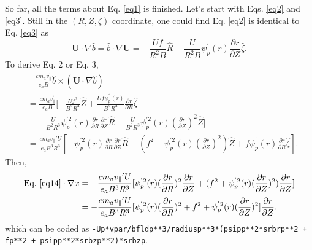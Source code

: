 \documentclass[12pt]{article}
\begin{document}
\begin{CJK*}{UTF8}{gbsn}
So far, all the terms about Eq. \ref{eq1} is finished. Let's start with Eqs. \ref{eq2} and \ref{eq3}.
Still in the $(R,Z,\zeta)$ coordinate, one could find Eq. \ref{eq2} is identical to Eq. \ref{eq3} as
\begin{equation}
    \mathbf{U}\cdot\nabla\hat{b} = \hat{b}\cdot\nabla\mathbf{U} = - \frac{Uf}{R^2B}\hat{R} - \frac{U}{R^2B}\psi_p^{'}(r)\frac{\partial r}{\partial Z}\hat{\zeta}.
\end{equation}
To derive Eq. 2 or Eq. 3, 
\begin{equation}
\begin{split}
    &\ \ \ \  \frac{cm_av_{\parallel}^{'}}{e_aB} \hat{b} \times (\mathbf{U}\cdot\nabla\hat{b}) \\&= \frac{cm_av_{\parallel}^{'}}{e_aB}
    [-\frac{Uf^2}{B^2R^3}\hat{Z} + \frac{Uf\psi^{'}_p(r)}{B^2R^3}\frac{\partial r}{\partial R}\hat{\zeta}\\
     &\ \ \ \ -\frac{U}{B^2R^3}\psi_p^{'2}(r)\frac{\partial r}{\partial R}\frac{\partial r}{\partial Z}\hat{R}
     -\frac{U}{B^2R^3}\psi_p^{'2}(r)(\frac{\partial r}{\partial Z})^2\hat{Z}]\\
    &=\frac{cm_av_{\parallel}{'}U}{e_aB^3R^3}[-\psi_p^{'2}(r)\frac{\partial r}{\partial R}\frac{\partial r}{\partial Z}\hat{R}
     -(f^2 + \psi_p^{'2}(r)(\frac{\partial r}{\partial Z})^2)\hat{Z} + f\psi_p^{'}(r)\frac{\partial r}{\partial R}\hat{\zeta}].\label{eq14}
\end{split}
\end{equation}
Then, 
\begin{equation}
\begin{split}
    \textrm{Eq.}\ \ref{eq14} \cdot\nabla x &= -\frac{cm_av_{\parallel}{'}U}{e_aB^3R^3}[\psi_p^{'2}(r)(\frac{\partial r}{\partial R})^2\frac{\partial r}{\partial Z}
    +(f^2 + \psi_p^{'2}(r)(\frac{\partial r}{\partial Z})^2)\frac{\partial r}{\partial Z}]\\
    &= -\frac{cm_av_{\parallel}{'}U}{e_aB^3R^3}[\psi_p^{'2}(r)(\frac{\partial r}{\partial R})^2
       +f^2 + \psi_p^{'2}(r)(\frac{\partial r}{\partial Z})^2]\frac{\partial r}{\partial Z},
\end{split}
\end{equation}
which can be coded as \texttt{-Up*vpar/bfldp**3/radiusp**3*(psipp**2*srbrp**2 + fp**2 + psipp**2*srbzp**2)*srbzp}.


\end{CJK*}
\end{document}
